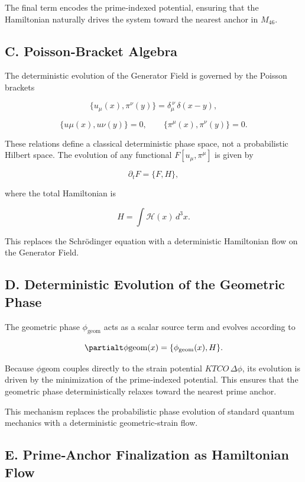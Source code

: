 \documentclass[reprint,amsmath,amssymb,aps,prl,floatfix]{revtex4-2}
\begin{document}
The final term encodes the prime‑indexed potential, ensuring that the Hamiltonian naturally drives the system toward the nearest anchor in \(M_{46}\).

\subsection{C. Poisson‑Bracket Algebra}

The deterministic evolution of the Generator Field is governed by the Poisson brackets

\[
\{u_\mu(x), \pi^\nu(y)\}
= \delta_\mu^{\ \nu}\,\delta(x-y),
\]

\[
\{u\mu(x), u\nu(y)\} = 0,
\qquad
\{\pi^\mu(x), \pi^\nu(y)\} = 0.
\]

These relations define a classical deterministic phase space, not a probabilistic Hilbert space. The evolution of any functional \(F[u_\mu,\pi^\mu]\) is given by

\[
\partial_t F = \{F, H\},
\]

where the total Hamiltonian is

\[
H = \int \mathcal{H}(x)\,d^3x.
\]

This replaces the Schrödinger equation with a deterministic Hamiltonian flow on the Generator Field.

\subsection{D. Deterministic Evolution of the Geometric Phase}

The geometric phase \(\phi_{\mathrm{geom}}\) acts as a scalar source term and evolves according to

\[
\partialt \phi{\mathrm{geom}}(x)
= \{\phi_{\mathrm{geom}}(x), H\}.
\]

Because \(\phi{\mathrm{geom}}\) couples directly to the strain potential \(K{TCO}\,\Delta\phi\), its evolution is driven by the minimization of the prime‑indexed potential. This ensures that the geometric phase deterministically relaxes toward the nearest prime anchor.

This mechanism replaces the probabilistic phase evolution of standard quantum mechanics with a deterministic geometric‑strain flow.

\subsection{E. Prime‑Anchor Finalization as Hamiltonian Flow}
\end{document}
